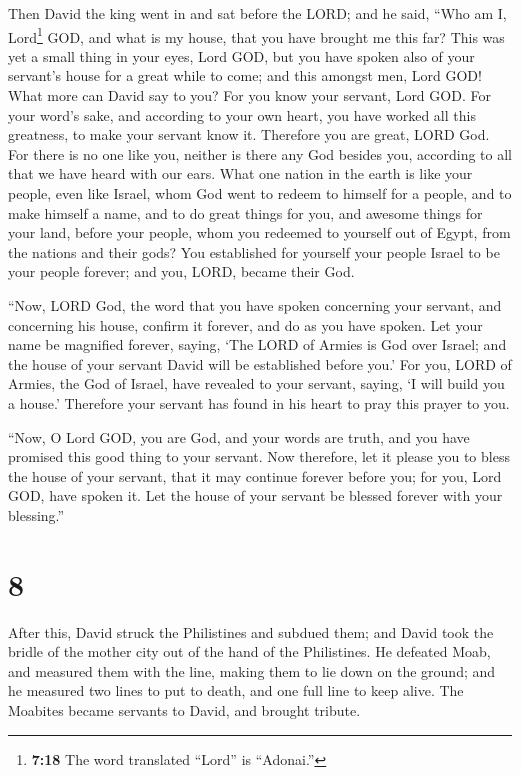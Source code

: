  Then David the king went in and sat before the LORD; and
he said, ``Who am I, Lord\footnote{\textbf{7:18} The word translated
  ``Lord'' is ``Adonai.''} GOD, and what is my house, that you have
brought me this far?  This was yet a small thing in your
eyes, Lord GOD, but you have spoken also of your servant's house for a
great while to come; and this amongst men, Lord GOD! 
What more can David say to you? For you know your servant, Lord GOD.
 For your word's sake, and according to your own heart,
you have worked all this greatness, to make your servant know it.
 Therefore you are great, LORD God. For there is no one
like you, neither is there any God besides you, according to all that we
have heard with our ears.  What one nation in the earth
is like your people, even like Israel, whom God went to redeem to
himself for a people, and to make himself a name, and to do great things
for you, and awesome things for your land, before your people, whom you
redeemed to yourself out of Egypt, from the nations and their gods?
 You established for yourself your people Israel to be
your people forever; and you, LORD, became their God.

 ``Now, LORD God, the word that you have spoken
concerning your servant, and concerning his house, confirm it forever,
and do as you have spoken.  Let your name be magnified
forever, saying, `The LORD of Armies is God over Israel; and the house
of your servant David will be established before you.' 
For you, LORD of Armies, the God of Israel, have revealed to your
servant, saying, `I will build you a house.' Therefore your servant has
found in his heart to pray this prayer to you.

 ``Now, O Lord GOD, you are God, and your words are
truth, and you have promised this good thing to your servant.
 Now therefore, let it please you to bless the house of
your servant, that it may continue forever before you; for you, Lord
GOD, have spoken it. Let the house of your servant be blessed forever
with your blessing.''

\hypertarget{section-7}{%
\section{8}\label{section-7}}

 After this, David struck the Philistines and subdued
them; and David took the bridle of the mother city out of the hand of
the Philistines.  He defeated Moab, and measured them with
the line, making them to lie down on the ground; and he measured two
lines to put to death, and one full line to keep alive. The Moabites
became servants to David, and brought tribute.

